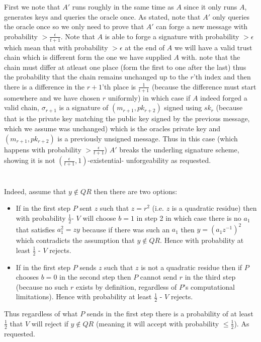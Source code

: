 \documentclass{article}
\begin{document}
First we note that $A'$ runs roughly in the same time as $A$ since it only runs $A$, generates keys and queries the oracle once.
As stated, note that $A'$ only queries the oracle once so we only need to prove that $A'$ can forge a new message with probability $>\frac{\epsilon}{t+1}$.
Note that $A$ is able to forge a signature with probability $> \epsilon$ which mean that with probability $>\epsilon$ at the end of $A$ we will have a valid trust chain which is different form the one we have supplied $A$ with. note that the chain must differ at atleast one place (form the first to one after the last) thus the probability that the chain remains unchanged up to the $r$'th index and then there is a difference in the $r+1$'th place is $\frac{1}{t+1}$ (because the difference must start somewhere and we have chosen $r$ uniformly) in which case if $A$ indeed forged a valid chain, $\sigma_{r+1}$ is a signature of $(m_{r+1}, pk_{r+2})$ signed using $sk_r$ (because that is the private key matching the public key signed by the previous message, which we assume was unchanged) which is the oracles private key and $(m_{r+1}, pk_{r+2})$ is a previously unsigned message. Thus in this case (which happens with probability $>\frac{\epsilon}{t+1}$) $A'$ breaks the underling signature scheme, showing it is not $(\frac{\epsilon}{t+1}, 1)$-existential- unforgeability  as requested.

\section{}%
\subsection{}%
Indeed, assume that $y\notin{QR}$ then there are two options:
\begin{itemize}
\item If in the first step $P$ sent $z$ such that $z = r^2$ (i.e. $z$ is a quadratic residue) then with probability $\frac{1}{2}$- $V$ will choose $b=1$ in step 2 in which case there is no $a_1$ that satisfies $a_1^2 = zy$ because if there was such an $a_1$ then $y = (a_1z^{-1})^2$ which contradicts the assumption that $y\notin{QR}$.
Hence with probability at least $\frac{1}{2}$ - $V$ rejects.
\item If in the first step $P$ sends $z$ such that $z$ is not a quadratic residue then if $P$ chooses $b=0$ in the second step then $P$ cannot send $r$ in the third step (because no such $r$ exists by definition, regardless of $P$'s computational limitations). Hence with probability at least $\frac{1}{2}$ - $V$ rejects.
\end{itemize}
Thus regardless of what $P$ sends in the first step there is a probability of at least $\frac{1}{2}$ that $V$ will reject if $y\notin{QR}$ (meaning it will accept with probability $\leq \frac{1}{2}$).
As requested.
\end{document}
